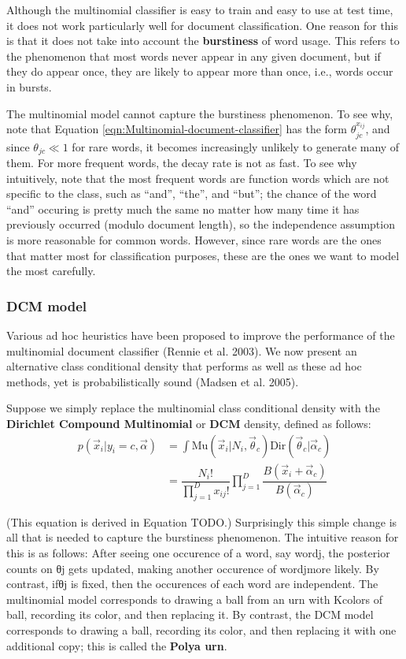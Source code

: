 Although the multinomial classifier is easy to train and easy to use at test time, it does not work particularly well for document classification. One reason for this is that it does not take into account the \textbf{burstiness} of word usage. This refers to the phenomenon that most words never appear in any given document, but if they do appear once, they are likely to appear more than once, i.e., words occur in bursts.

The multinomial model cannot capture the burstiness phenomenon. To see why, note that Equation \ref{eqn:Multinomial-document-classifier} has the form $\theta_{jc}^{x_{ij}}$, and since $\theta_{jc} \ll 1$ for rare words, it becomes increasingly unlikely to generate many of them. For more frequent words, the decay rate is not as fast. To see why intuitively, note that the most frequent words are function words which are not specific to the class, such as “and”, “the”, and “but”; the chance of the word “and” occuring is pretty much the same no matter how many time it has previously occurred (modulo document length), so the independence assumption is more reasonable for common words. However, since rare words are the ones that matter most for classification purposes, these are the ones we want to model the most carefully.

\subsubsection{DCM model}
Various ad hoc heuristics have been proposed to improve the performance of the multinomial document classifier (Rennie et al. 2003). We now present an alternative class conditional density that performs as well as these ad hoc methods, yet is probabilistically sound (Madsen et al. 2005).

Suppose we simply replace the multinomial class conditional density with the \textbf{Dirichlet Compound Multinomial} or \textbf{DCM} density, defined as follows:
\begin{equation}\begin{split}
p(\vec{x}_i|y_i=c,\vec{\alpha}) & =\int \text{Mu}(\vec{x}_i|N_i,\vec{\theta}_c)\text{Dir}(\vec{\theta}_c|\vec{\alpha}_c) \\
   & =\dfrac{N_i!}{\prod_{j=1}^D x_{ij}!}\prod\limits_{j=1}^D\dfrac{B(\vec{x}_i+\vec{\alpha}_c)}{B(\vec{\alpha}_c)}
\end{split}\end{equation}

(This equation is derived in Equation TODO.) Surprisingly this simple change is all that is needed to capture the burstiness phenomenon. The intuitive reason for this is as follows: After seeing one occurence of a word, say wordj, the posterior counts on θj gets updated, making another occurence of wordjmore likely. By contrast, ifθj is fixed, then the occurences of each word are independent. The multinomial model corresponds to drawing a ball from an urn with Kcolors of ball, recording its color, and then replacing it. By contrast, the DCM model corresponds to drawing a ball, recording its color, and then replacing it with one additional copy; this is called the \textbf{Polya urn}.

